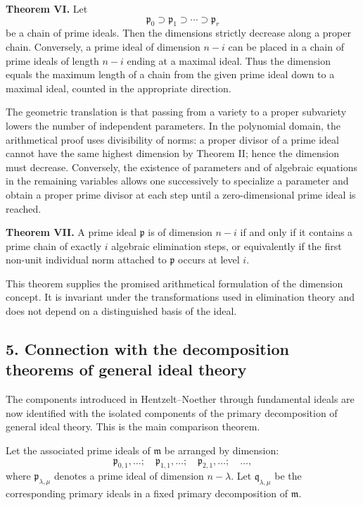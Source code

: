 \documentclass[11pt]{article}
\begin{document}
\textbf{Theorem VI.} Let
\[
  \mathfrak p_0\supset \mathfrak p_1\supset\cdots\supset \mathfrak p_r
\]
be a chain of prime ideals. Then the dimensions strictly decrease along a proper chain. Conversely, a prime ideal of dimension $n-i$ can be placed in a chain of prime ideals of length $n-i$ ending at a maximal ideal. Thus the dimension equals the maximum length of a chain from the given prime ideal down to a maximal ideal, counted in the appropriate direction.

The geometric translation is that passing from a variety to a proper subvariety lowers the number of independent parameters. In the polynomial domain, the arithmetical proof uses divisibility of norms: a proper divisor of a prime ideal cannot have the same highest dimension by Theorem II; hence the dimension must decrease. Conversely, the existence of parameters and of algebraic equations in the remaining variables allows one successively to specialize a parameter and obtain a proper prime divisor at each step until a zero-dimensional prime ideal is reached.

\textbf{Theorem VII.} A prime ideal $\mathfrak p$ is of dimension $n-i$ if and only if it contains a prime chain of exactly $i$ algebraic elimination steps, or equivalently if the first non-unit individual norm attached to $\mathfrak p$ occurs at level $i$.

This theorem supplies the promised arithmetical formulation of the dimension concept. It is invariant under the transformations used in elimination theory and does not depend on a distinguished basis of the ideal.

\subsection{5. Connection with the decomposition theorems of general ideal theory}

The components introduced in Hentzelt--Noether through fundamental ideals are now identified with the isolated components of the primary decomposition of general ideal theory. This is the main comparison theorem.

Let the associated prime ideals of $\mathfrak m$ be arranged by dimension:
\[
  \mathfrak p_{0,1},\ldots;\quad \mathfrak p_{1,1},\ldots;\quad \mathfrak p_{2,1},\ldots;\quad\ldots,
\]
where $\mathfrak p_{\lambda,\mu}$ denotes a prime ideal of dimension $n-\lambda$. Let $\mathfrak q_{\lambda,\mu}$ be the corresponding primary ideals in a fixed primary decomposition of $\mathfrak m$.
\end{document}
